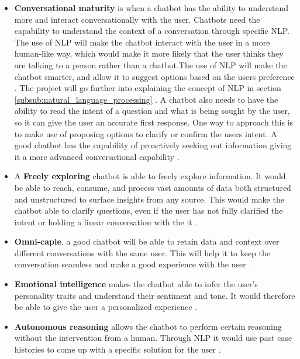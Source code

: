 \begin{itemize}
    \item \textbf{Conversational maturity} is when a chatbot has the ability to understand more and interact conversationally with the user. Chatbots need the capability to understand the context of a conversation through specific NLP. The use of NLP will make the chatbot interact with the user in a more human-like way, which would make it more likely that the user thinks they are talking to a person rather than a chatbot.The use of NLP will make the chatbot smarter, and allow it to suggest options based on the users preference \cite{MayaS2017TopNewlands}. The project will go further into explaining the concept of NLP in section \ref{subsub:natural_language_processing} .
    \newline
    A chatbot also needs to have the ability to read the intent of a question and what is being sought by the user, so it can give the user an accurate first response. One way to approach this is to make use of proposing options to clarify or confirm the users intent. A good chatbot has the capability of proactively seeking out information giving it a more advanced conversational capability \cite{Furniss20177Chatbot}.
    
    \item A \textbf{Freely exploring} chatbot is able to freely explore information. It would be able to reach, consume, and process vast amounts of data both structured and unstructured to surface insights from any source.
    This would make the chatbot able to clarify questions, even if the user has not fully clarified the intent or holding a linear conversation with the it \cite{Furniss20177Chatbot}.
    
    \item \textbf{Omni-caple}, a good chatbot will be able to retain data and context over different conversations with the same user. This will help it to keep the conversation seamless and make a good experience with the user \cite{Furniss20177Chatbot}.
    
    \item \textbf{Emotional intelligence} makes the chatbot able  to infer the user's personality traits and understand their sentiment and tone. It would therefore be able to give the user a personalized experience \cite{Furniss20177Chatbot}.
    
    \item \textbf{Autonomous reasoning} allows the chatbot to perform certain reasoning without the intervention from a human. Through NLP it would use past case histories to come up with a specific solution for the user \cite{Furniss20177Chatbot}.
\end{itemize}

